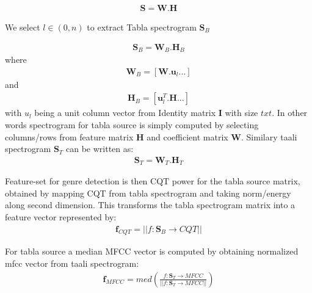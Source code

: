 \documentclass{article}
\begin{document}
\begin{align}\label{eq:eq1}
\boldsymbol{S} = \boldsymbol{W}.\boldsymbol{H}
\end{align}

We select $l \in (0,n)$ to extract Tabla spectrogram $\boldsymbol{S}_{B}$ 

\begin{align}\label{eq:eq2}
\boldsymbol{S}_{B} = \boldsymbol{W}_{B}.\boldsymbol{H}_{B}
\end{align}
where
\begin{align}\label{eq:eq3}
\boldsymbol{W}_{B} = [\boldsymbol{W}.\boldsymbol{u}_{l} ...]
\end{align}
and 
\begin{align}\label{eq:eq4}
\boldsymbol{H}_{B} = [\boldsymbol{u}_{l}^T.\boldsymbol{H} ...]
\end{align}
with $u_{l}$ being a unit column vector from Identity matrix $\boldsymbol{I}$ with size $txt$. In other words spectrogram for tabla source is simply computed
by selecting columns/rows from feature matrix $\boldsymbol{H}$ and coefficient matrix $\boldsymbol{W}$. Similary taali spectrogram $\boldsymbol{S}_{T}$ can be written as:
\begin{align}\label{eq:eq5}
\boldsymbol{S}_{T} = \boldsymbol{W}_{T}.\boldsymbol{H}_{T}
\end{align}

Feature-set for genre detection is then CQT power for the tabla source matrix, obtained by mapping CQT from tabla spectrogram and taking norm/energy along second dimension. This transforms the tabla spectrogram matrix into a feature vector represented by:
\begin{align}\label{eq:eq6}
\boldsymbol{f}_{CQT} = \lvert \lvert f\colon \boldsymbol{S}_{B}\to CQT \rvert \rvert
\end{align}

For tabla source a median MFCC vector is computed by obtaining normalized mfcc vector from taali spectrogram:
\begin{align}\label{eq:eq7}
\boldsymbol{f}_{MFCC} = med(\frac{f\colon \boldsymbol{S}_{T}\to MFCC}{\lvert \lvert {f\colon \boldsymbol{S}_{T}\to MFCC} \rvert \rvert})
\end{align}
\end{document}
